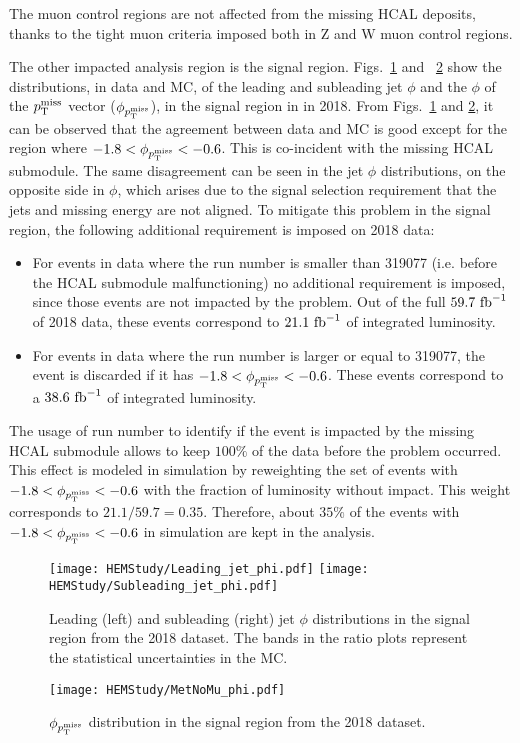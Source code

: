 The muon control regions are not affected from the missing HCAL deposits, 
thanks to the tight muon criteria imposed both in Z and W muon control regions.

The other impacted analysis region is the signal region. 
Figs.~\ref{fig:sr_2018_noHemCut_jetlead} and ~\ref{fig:sr_2018_noHemCut_met} show the distributions, in data and MC, of the leading and subleading 
jet $\phi$ and the $\phi$ of the $p_{\textrm{T}}^{\textrm{miss}}$ vector ($\phi_{p_{\textrm{T}}^{\textrm{miss}}}$), in the signal region in in 2018. 
From Figs.~\ref{fig:sr_2018_noHemCut_jetlead} and \ref{fig:sr_2018_noHemCut_met}, it can be observed that the agreement between data and MC is good 
except for the region where $-1.8 < \phi_{p_{\textrm{T}}^{\textrm{miss}}} < -0.6$. This is co-incident 
with the missing HCAL submodule. The same disagreement can be seen in the jet $\phi$ distributions, on the opposite side in $\phi$, 
which arises due to the signal selection requirement that the jets and missing energy are not aligned.
To mitigate this problem in the signal region, the following additional requirement is imposed on 2018 data:

\begin{itemize}
    \item For events in data where the run number is smaller than 319077 (i.e. before the HCAL submodule malfunctioning)
    no additional requirement is imposed, since those events are not impacted by the problem. Out of the full $59.7 \ \fbinv$
    of 2018 data, these events correspond to $21.1 \ \textrm{fb}^{-1}$ of integrated luminosity.
    \item For events in data where the run number is larger or equal to 319077, the event is discarded
    if it has $-1.8 < \phi_{p_{\textrm{T}}^{\textrm{miss}}} < -0.6$. These events correspond to a $38.6 \ \textrm{fb}^{-1}$ of integrated luminosity. 
\end{itemize}

The usage of run number to identify if the event is impacted by the missing HCAL submodule allows to keep $100\%$ of the data   
before the problem occurred. This effect is modeled in simulation by reweighting the set of events with $-1.8 < \phi_{p_{\textrm{T}}^{\textrm{miss}}} < -0.6$
with the fraction of luminosity without impact. This weight corresponds to $21.1 / 59.7 = 0.35$. Therefore, about $35\%$ of the events
with $-1.8 < \phi_{p_{\textrm{T}}^{\textrm{miss}}} < -0.6$ in simulation are kept in the analysis.

\begin{figure}[htbp]
    \begin{center}
        \texttt{[image: HEMStudy/Leading\_jet\_phi.pdf]}
        \texttt{[image: HEMStudy/Subleading\_jet\_phi.pdf]}
    \end{center}
    \caption{Leading (left) and subleading (right) jet $\phi$ distributions in the signal region from the 2018 dataset.
    The bands in the ratio plots represent the statistical uncertainties in the MC.}
    \label{fig:sr_2018_noHemCut_jetlead}
\end{figure}

\begin{figure}[htbp]
    \begin{center}
        \texttt{[image: HEMStudy/MetNoMu\_phi.pdf]}
    \end{center}
    \caption{$\phi_{p_{\textrm{T}}^{\textrm{miss}}}$ distribution in the signal region from the 2018 dataset.}
    \label{fig:sr_2018_noHemCut_met}
\end{figure}

\clearpage